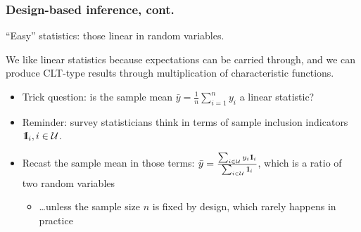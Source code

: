 \documentclass{beamer}
\newcommand{\One}{{\rm 1\kern-0.3em I}}
\begin{document}
\begin{frame}\frametitle{Design-based inference, cont.}

``Easy'' statistics: those linear in random variables.

\bigskip

We like linear statistics because expectations can be carried through,
and we can produce CLT-type results through multiplication of characteristic functions.

\begin{itemize}
    \item Trick question: is the sample mean $\bar y = \frac 1n\sum_{i=1}^n y_i$ a linear statistic?
	 \item Reminder: survey statisticians think in terms of sample inclusion indicators 
	       $\One_i, i\in\mathcal{U}$.
    \item Recast the sample mean in those terms: 
          $\bar y = \frac{\sum_{i\in\mathcal{U}} y_i \One_i}{\sum_{i\in\mathcal{U}} \One_i}$,
          which is a ratio of two random variables
	 \begin{itemize}
	      \item \ldots unless the sample size $n$ is fixed by design, which rarely happens in practice
	 \end{itemize}
\end{itemize}

\end{frame}
\end{document}
